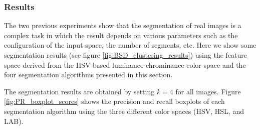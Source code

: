 \documentclass[journal]{IEEEtran}
\begin{document}
\subsubsection{Results}
The two previous experiments show that the segmentation of real images is a complex task in which the result depends on various parameters such as the configuration of the input space, the number of segments, etc. Here we show some segmentation results (see figure \ref{fig:BSD_clustering_results}) using the feature space derived from the HSV-based luminance-chrominance color space and the four segmentation algorithms presented in this section.

The segmentation results are obtained by setting $k = 4$ for all images. Figure \ref{fig:PR_boxplot_scores} shows the precision and recall boxplots of each segmentation algorithm using the three different color spaces (HSV, HSL, and LAB).
\end{document}

